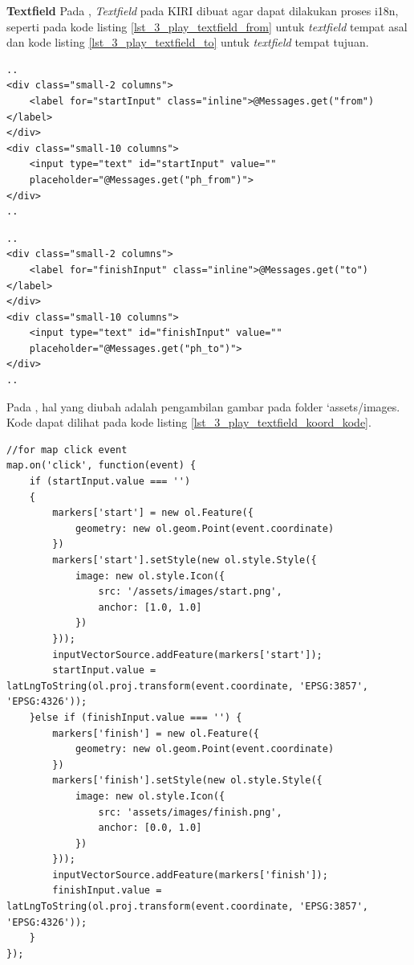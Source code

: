 \documentclass[a4paper,twoside]{article}
\begin{document}
\begin{enumerate}
\textbf{Textfield}
Pada \play, \textit{Textfield} pada KIRI dibuat  agar dapat dilakukan proses i18n, seperti pada kode listing \ref{lst_3_play_textfield_from} untuk \textit{textfield} tempat asal dan kode listing \ref{lst_3_play_textfield_to} untuk \textit{textfield} tempat tujuan.

\begin{lstlisting}[caption=Menampilkan \textit{textfield} tempat awal kepada pengguna ,label = {lst_3_play_textfield_from}]
..
<div class="small-2 columns">
    <label for="startInput" class="inline">@Messages.get("from")</label>
</div>
<div class="small-10 columns">
    <input type="text" id="startInput" value=""
    placeholder="@Messages.get("ph_from")">
</div>
..
\end{lstlisting}

\begin{lstlisting}[caption=Menampilkan \textit{textfield} tempat tujuan kepada pengguna ,label = {lst_3_play_textfield_to}]
..
<div class="small-2 columns">
    <label for="finishInput" class="inline">@Messages.get("to")</label>
</div>
<div class="small-10 columns">
    <input type="text" id="finishInput" value=""
    placeholder="@Messages.get("ph_to")">
</div>
..
\end{lstlisting}
	
Pada \play, hal yang diubah adalah pengambilan gambar pada folder `assets/images. Kode dapat dilihat pada kode listing \ref{lst_3_play_textfield_koord_kode}.

\begin{lstlisting}[caption=Membuat \textit{event} klik pada peta,label = {lst_3_play_textfield_koord_kode}]
//for map click event
map.on('click', function(event) {
    if (startInput.value === '')
    {
        markers['start'] = new ol.Feature({
            geometry: new ol.geom.Point(event.coordinate)
        })
        markers['start'].setStyle(new ol.style.Style({
            image: new ol.style.Icon({
                src: '/assets/images/start.png',
                anchor: [1.0, 1.0]
            })
        }));
        inputVectorSource.addFeature(markers['start']);
        startInput.value = latLngToString(ol.proj.transform(event.coordinate, 'EPSG:3857', 'EPSG:4326'));
    }else if (finishInput.value === '') {
        markers['finish'] = new ol.Feature({
            geometry: new ol.geom.Point(event.coordinate)
        })
        markers['finish'].setStyle(new ol.style.Style({
            image: new ol.style.Icon({
                src: 'assets/images/finish.png',
                anchor: [0.0, 1.0]
            })
        }));
        inputVectorSource.addFeature(markers['finish']);
        finishInput.value = latLngToString(ol.proj.transform(event.coordinate, 'EPSG:3857', 'EPSG:4326'));
    }
});
\end{lstlisting}


\end{enumerate}
\end{document}
